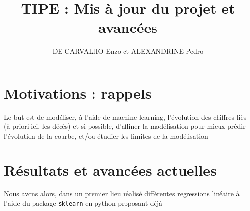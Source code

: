 \documentclass[a4paper,11pt]{article}
\title{TIPE : Mis à jour du projet et avancées}
\author{DE CARVALHO Enzo et ALEXANDRINE Pedro}
\begin{document}
\maketitle
\section{Motivations : rappels}
	Le but est de modéliser, à l'aide de machine learning, l'évolution des 
	chiffres liès (à priori ici, les décès) et si possible, d'affiner la 			modélisation pour mieux prédir l'évolution de la courbe, et/ou étudier 			les limites de la modélisation

\section{Résultats et avancées actuelles}
	Nous avons alors, dans un premier lieu réalisé différentes regressions
	linéaire à l'aide du package \texttt{sklearn} en python proposant déjà
\end{document}
